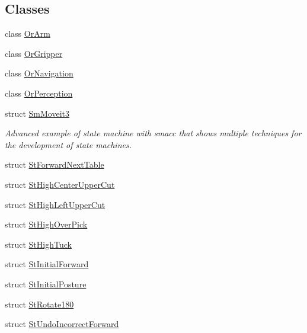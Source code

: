 \subsection*{Classes}
\begin{DoxyCompactItemize}
\item 
class \hyperlink{classsm__moveit__3_1_1OrArm}{Or\+Arm}
\item 
class \hyperlink{classsm__moveit__3_1_1OrGripper}{Or\+Gripper}
\item 
class \hyperlink{classsm__moveit__3_1_1OrNavigation}{Or\+Navigation}
\item 
class \hyperlink{classsm__moveit__3_1_1OrPerception}{Or\+Perception}
\item 
struct \hyperlink{structsm__moveit__3_1_1SmMoveit3}{Sm\+Moveit3}
\begin{DoxyCompactList}\small\item\em Advanced example of state machine with smacc that shows multiple techniques for the development of state machines. \end{DoxyCompactList}\item 
struct \hyperlink{structsm__moveit__3_1_1StForwardNextTable}{St\+Forward\+Next\+Table}
\item 
struct \hyperlink{structsm__moveit__3_1_1StHighCenterUpperCut}{St\+High\+Center\+Upper\+Cut}
\item 
struct \hyperlink{structsm__moveit__3_1_1StHighLeftUpperCut}{St\+High\+Left\+Upper\+Cut}
\item 
struct \hyperlink{structsm__moveit__3_1_1StHighOverPick}{St\+High\+Over\+Pick}
\item 
struct \hyperlink{structsm__moveit__3_1_1StHighTuck}{St\+High\+Tuck}
\item 
struct \hyperlink{structsm__moveit__3_1_1StInitialForward}{St\+Initial\+Forward}
\item 
struct \hyperlink{structsm__moveit__3_1_1StInitialPosture}{St\+Initial\+Posture}
\item 
struct \hyperlink{structsm__moveit__3_1_1StRotate180}{St\+Rotate180}
\item 
struct \hyperlink{structsm__moveit__3_1_1StUndoIncorrectForward}{St\+Undo\+Incorrect\+Forward}
\end{DoxyCompactItemize}
